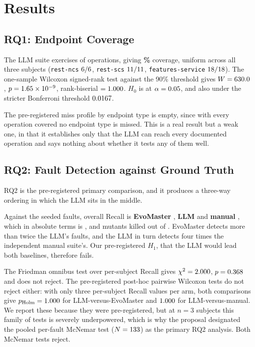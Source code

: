 \section{Results}
\label{sec:results}

\subsection{RQ1: Endpoint Coverage}

The LLM suite exercises \RQIopsCovered{} of \RQIopsTotal{} operations, giving
\textbf{\RQIcoveragePct\%} coverage, uniform across all three subjects (\texttt{rest-ncs}
$6/6$, \texttt{rest-scs} $11/11$,
\texttt{features-service} $18/18$). The one-sample Wilcoxon
signed-rank test against the 90\% threshold gives $W=630.0$, $p=1.65\times10^{-9}$,
rank-biserial $=1.000$. $H_0$ is \textbf{\RQIreject} at $\alpha=0.05$, and
also under the stricter Bonferroni threshold $0.0167$.

The pre-registered miss profile by endpoint type is empty, since with every operation covered
no endpoint type is missed. This is a real result but a weak one, in that it establishes only
that the LLM can reach every documented operation and says nothing about whether it tests any
of them well.

\subsection{RQ2: Fault Detection against Ground Truth}
\label{sec:results-rq2}

RQ2 is the pre-registered primary comparison, and it produces a three-way ordering in which
the LLM sits in the middle.

Against the \RQIIn{} seeded faults, overall Recall is \textbf{EvoMaster \RQIIrecallEvo},
\textbf{LLM \RQIIrecallLlm} and \textbf{manual \RQIIrecallManual}, which in absolute terms is
\PDkilledEvo{}, \PDkilledLlm{} and \PDkilledManual{} mutants killed out of \PDkilledTotal{}.
EvoMaster detects more than twice the LLM's faults, and the LLM in turn detects four times the
independent manual suite's. Our pre-registered $H_1$, that the LLM would lead both baselines,
therefore fails.

The Friedman omnibus test over per-subject Recall gives $\chi^2=2.000$,
$p=0.368$ and does not reject. The pre-registered post-hoc pairwise Wilcoxon tests do
not reject either: with only three per-subject Recall values per arm, both comparisons give
$p_{\text{Holm}}=1.000$ for LLM-versus-EvoMaster and $1.000$ for
LLM-versus-manual. We report these because they were pre-registered, but at $n=3$ subjects
this family of tests is severely underpowered, which is why the proposal designated the pooled
per-fault McNemar test ($N=133$) as the primary RQ2 analysis. Both McNemar tests reject.

